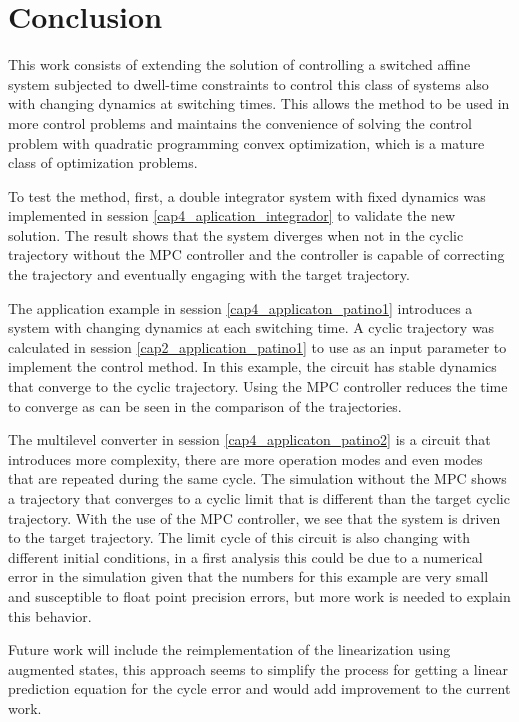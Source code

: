 \chapter{Conclusion}

This work consists of extending the solution of controlling a switched affine system 
subjected to dwell-time constraints to control this class of systems also with changing 
dynamics at switching times. This allows the method to be used in more control problems 
and maintains the convenience of solving the control problem with quadratic programming 
convex optimization, which is a mature class of optimization problems.

To test the method, first, a double integrator system with fixed dynamics was implemented in session \ref{cap4_aplication_integrador}
to validate the new solution. The result shows that the system diverges when not in the cyclic trajectory without the MPC controller and 
the controller is capable of correcting the trajectory and eventually engaging with the target trajectory.

The application example in session \ref{cap4_applicaton_patino1} introduces a system with changing dynamics at each switching time. 
A cyclic trajectory was calculated in session \ref{cap2_application_patino1} to use as an input parameter to implement the control method.
In this example, the circuit has stable dynamics that converge to the cyclic trajectory. Using the MPC controller reduces the time to converge
as can be seen in the comparison of the trajectories.

The multilevel converter in session \ref{cap4_applicaton_patino2} is a circuit that 
introduces more complexity, there are more operation modes and even modes that are repeated
during the same cycle. The simulation without the MPC shows a trajectory that converges to a cyclic limit 
that is different than the target cyclic trajectory. With the use of the MPC controller, we see that the system 
is driven to the target trajectory. The limit cycle of this circuit is also changing with different initial conditions,
in a first analysis this could be due to a numerical error in the simulation given that the numbers for this example 
are very small and susceptible to float point precision errors, but more work is needed to explain this behavior.


Future work will include the reimplementation of the linearization using augmented states, this approach seems to simplify
the process for getting a linear prediction equation for the cycle error and would add improvement to the current work.

